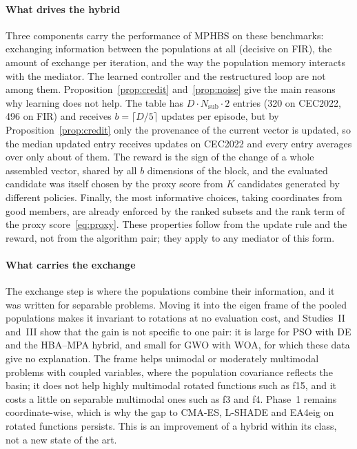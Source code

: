 \paragraph{What drives the hybrid} Three components carry the performance of MPHBS on these benchmarks: exchanging
information between the populations at all (decisive on FIR), the amount of exchange per iteration, and the way the
population memory interacts with the mediator. The learned controller and the restructured loop are not among them.
Proposition~\ref{prop:credit} and~\ref{prop:noise} give the main reasons why learning does not help. The table has
$D\cdot N_\mathrm{sub}\cdot 2$ entries (320 on CEC2022, 496 on FIR) and receives $b=\lceil D/5\rceil$ updates per episode,
but by Proposition~\ref{prop:credit} only the provenance of the current vector is updated, so the median updated entry
receives  updates on CEC2022 and every entry averages over only about
 of them. The reward is the sign of the change of a whole assembled vector, shared by all $b$ dimensions of
the block, and the evaluated candidate was itself chosen by the proxy score from $K$ candidates generated by different
policies. Finally, the most informative choices, taking coordinates from good members, are already enforced by the ranked
subsets and the rank term of the proxy score~\eqref{eq:proxy}. These properties follow from the update rule and the
reward, not from the algorithm pair; they apply to any mediator of this form.

\paragraph{What carries the exchange} The exchange step is where the populations combine their information, and it was
written for separable problems. Moving it into the eigen frame of the pooled populations makes it invariant to rotations at
no evaluation cost, and Studies~II and~III show that the gain is not specific to one pair: it is large for PSO with DE and the
HBA--MPA hybrid, and small for GWO with WOA, for which these data give no explanation. The
frame helps unimodal or moderately multimodal problems with coupled variables, where the population covariance reflects the
basin; it does not help highly multimodal rotated functions such as f15, and it costs a little on separable multimodal ones
such as f3 and f4. Phase~1 remains coordinate-wise, which is why the gap to CMA-ES, L-SHADE and EA4eig on rotated functions
persists. This is an improvement of a hybrid within its class, not a new state of the art.

